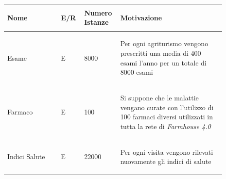 \documentclass[12pt,a4paper]{article}
\begin{document}
\begin{center}\setlength{\extrarowheight}{1.5pt}\begin{longtable}{|p{0.23\linewidth}|p{0.1\linewidth}|p{0.11\linewidth}|p{0.45\linewidth}|}
\hline \textbf{Nome}   & \begin{center}\vspace{-15pt}\textbf{E/R}\end{center} & \textbf{Numero Istanze} & \textbf{Motivazione}\\ 

    
\hline
Esame
 & 
\begin{center}\vspace{-25pt}E\end{center}
 & 
\begin{center}\vspace{-25pt}8000\end{center}
 & 
\begin{flushleft}\vspace{-25pt}Per ogni agriturismo vengono prescritti una media di 400 esami l'anno per un totale di 8000 esami\end{flushleft}
\\

\hline
Farmaco
 & 
\begin{center}\vspace{-25pt}E\end{center}
 & 
\begin{center}\vspace{-25pt}100\end{center}
 & 
\begin{flushleft}\vspace{-25pt}Si suppone che le malattie vengano curate con l'utilizzo di 100 farmaci diversi utilizzati in tutta la rete di \textit{Farmhouse 4.0}\end{flushleft}
\\

\hline
Indici Salute
 & 
\begin{center}\vspace{-25pt}E\end{center}
 & 
\begin{center}\vspace{-25pt}22000\end{center}
 & 
\begin{flushleft}\vspace{-25pt}Per ogni visita vengono rilevati nuovamente gli indici di salute\end{flushleft}
\\


\end{longtable}
\end{center}
\end{document}
